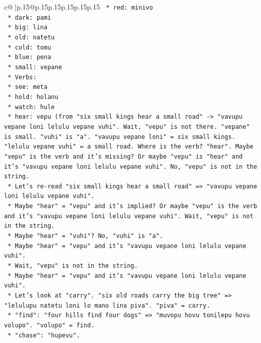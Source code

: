 \documentclass{article}
\begin{document}
{\begin{supertabular}{c@{$\;$}|p{.15\linewidth}@{}p{.15\linewidth}p{.15\linewidth}p{.15\linewidth}p{.15\linewidth}p{.15\linewidth}}
{{{\texttt{            *   red: minivo} \\
\texttt{            *   dark: pami} \\
\texttt{            *   big: lina} \\
\texttt{            *   old: natetu} \\
\texttt{            *   cold: tomu} \\
\texttt{            *   blue: pena} \\
\texttt{            *   small: vepane} \\
\texttt{        *   Verbs:} \\
\texttt{            *   see: meta} \\
\texttt{            *   hold: holanu} \\
\texttt{            *   watch: hule} \\
\texttt{            *   hear: vepu (from "six small kings hear a small road" {-}> "vavupu vepane loni lelulu vepane vuhi". Wait, "vepu" is not there. "vepane" is small. "vuhi" is "a". "vavupu vepane loni" = six small kings. "lelulu vepane vuhi" = a small road. Where is the verb? "hear". Maybe "vepu" is the verb and it's missing? Or maybe "vepu" is "hear" and it's "vavupu vepane loni lelulu vepane vuhi". No, "vepu" is not in the string.} \\
\texttt{            *   Let's re{-}read "six small kings hear a small road" => "vavupu vepane loni lelulu vepane vuhi".} \\
\texttt{            *   Maybe "hear" = "vepu" and it's implied? Or maybe "vepu" is the verb and it's "vavupu vepane loni lelulu vepane vuhi". Wait, "vepu" is not in the string.} \\
\texttt{            *   Maybe "hear" = "vuhi"? No, "vuhi" is "a".} \\
\texttt{            *   Maybe "hear" = "vepu" and it's "vavupu vepane loni lelulu vepane vuhi".} \\
\texttt{            *   Wait, "vepu" is not in the string.} \\
\texttt{            *   Maybe "hear" = "vepu" and it's "vavupu vepane loni lelulu vepane vuhi".} \\
\texttt{            *   Let's look at "carry". "six old roads carry the big tree" => "lelulupu natetu loni lo mano lina piva". "piva" = carry.} \\
\texttt{            *   "find": "four hills find four dogs" => "muvopu hovu tonilepu hovu volupo". "volupo" = find.} \\
\texttt{            *   "chase": "hupevu".} \\
}}}
\end{supertabular}}
\end{document}
